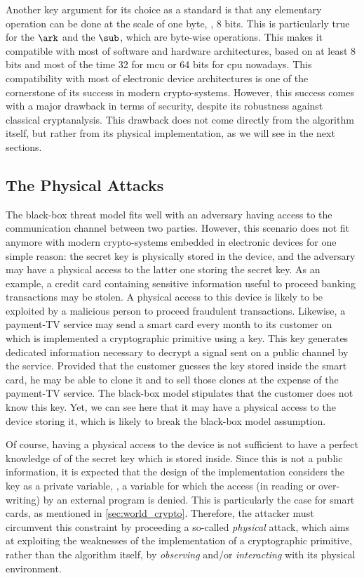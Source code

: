 Another key argument for its choice as a standard is that any elementary operation can be done at the scale of one byte, \ie{}, 8 bits.
This is particularly true for the \(\ark\) and the \(\sub\), which are byte-wise operations.
This makes it compatible with most of software and hardware architectures, based on at least 8 bits and most of the time 32 for \gls{mcu} or 64 bits for \gls{cpu} nowadays.
This compatibility with most of electronic device architectures is one of the cornerstone of its success in modern crypto-systems.
However, this success comes with a major drawback in terms of security, despite its robustness against classical cryptanalysis.
This drawback does not come directly from the algorithm itself, but rather from its physical implementation, as we will see in the next sections.

\subsection{The Physical Attacks}
The black-box threat model fits well with an adversary having access to the communication channel between two parties.
However, this scenario does not fit anymore with modern crypto-systems embedded in electronic devices for one simple reason: the secret key is physically stored in the device, and the adversary may have a physical access to the latter one storing the secret key.
As an example, a credit card containing sensitive information useful to proceed banking transactions may be stolen.
A physical access to this device is likely to be exploited by a malicious person to proceed fraudulent transactions.
Likewise, a payment-TV service may send a smart card every month to its customer on which is implemented a cryptographic primitive using a key.
This key generates dedicated information necessary to decrypt a signal sent on a public channel by the service.
Provided that the customer guesses the key stored inside the smart card, he may be able to clone it and to sell those clones at the expense of the payment-TV service.
The black-box model stipulates that the customer does not know this key.
Yet, we can see here that it may have a physical access to the device storing it, which is likely to break the black-box model assumption.

Of course, having a physical access to the device is not sufficient to have a perfect knowledge of of the secret key which is stored inside.
Since this is not a public information, it is expected that the design of the implementation considers the key as a private variable, \ie{}, a variable for which the access (in reading or over-writing) by an external program is denied.
This is particularly the case for smart cards, as mentioned in \autoref{sec:world_crypto}.
Therefore, the attacker must circumvent this constraint by proceeding a so-called \emph{physical} attack, which aims at exploiting the weaknesses of the implementation of a cryptographic primitive, rather than the algorithm itself, by \emph{observing} and/or \emph{interacting} with its physical environment.

